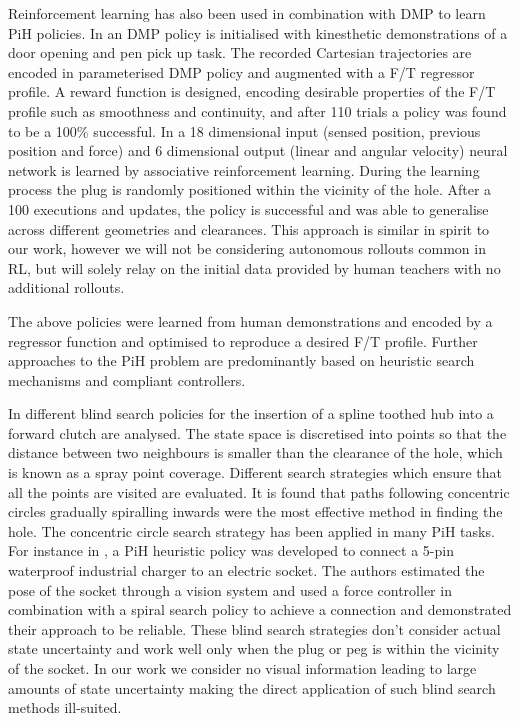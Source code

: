 Reinforcement learning has also been used in combination with DMP to learn PiH policies. In \cite{learn_force_c_icirs_2011}
an DMP policy is initialised with kinesthetic demonstrations of a door opening and pen pick up task. The recorded Cartesian 
trajectories are encoded in parameterised DMP policy and augmented with a F/T regressor profile. A reward function is designed, 
encoding desirable properties of the F/T profile such as smoothness and continuity, and after 110 trials a policy
was found to be a 100\% successful. In \cite{learn_admittance_icra_1994} a 18 dimensional input (sensed position, previous position and force)  and 6 dimensional 
output (linear and angular velocity) neural network is learned by associative reinforcement learning. 
During the learning process the plug is randomly positioned within the vicinity of the hole. After a 100 executions and 
updates, the policy is successful and was able to generalise across different geometries and clearances.
This approach is similar in spirit to our work, however we will not be considering autonomous rollouts common 
in RL, but will solely relay on the initial data provided by human teachers with no additional rollouts.

The above policies were learned from human demonstrations and encoded by a regressor function and
optimised to reproduce a desired F/T profile. Further approaches to the PiH problem 
are predominantly based on heuristic search mechanisms and compliant controllers.

In \cite{search_strategies_icra_2001} different blind search policies for the insertion of a spline toothed hub 
into a forward clutch are analysed. The state space is discretised into points so that the distance between two 
neighbours is smaller than the clearance of the hole, which is known as a spray point coverage. Different search 
strategies which ensure that all the points are visited are evaluated. It is found that paths following  
concentric circles gradually spiralling inwards were the most effective method in finding the hole. The concentric circle
search strategy has been applied in many PiH tasks. For instance in \cite{peg_imcssd_2015}, a PiH heuristic 
policy was developed to connect a 5-pin waterproof industrial charger to an electric socket. The authors 
estimated the pose of the socket through a vision system and used a force controller in combination with a 
spiral search policy to achieve a connection and demonstrated their approach to be reliable. 
These blind search strategies don't consider actual state uncertainty and work well only when the plug or 
peg is within the vicinity of the socket. In our work we consider no visual information leading to large
amounts of state uncertainty making the direct application of such blind search methods ill-suited.

